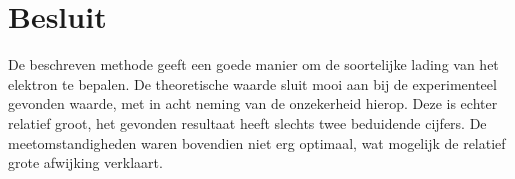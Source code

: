 \section{Besluit}

De beschreven methode geeft een goede manier om de soortelijke lading van het 
elektron te bepalen. De theoretische waarde sluit mooi aan bij de experimenteel 
gevonden waarde, met in acht neming van de onzekerheid hierop. Deze is echter 
relatief groot, het gevonden resultaat heeft slechts twee beduidende cijfers.
De meetomstandigheden waren bovendien niet erg optimaal, wat mogelijk de 
relatief grote afwijking verklaart.

